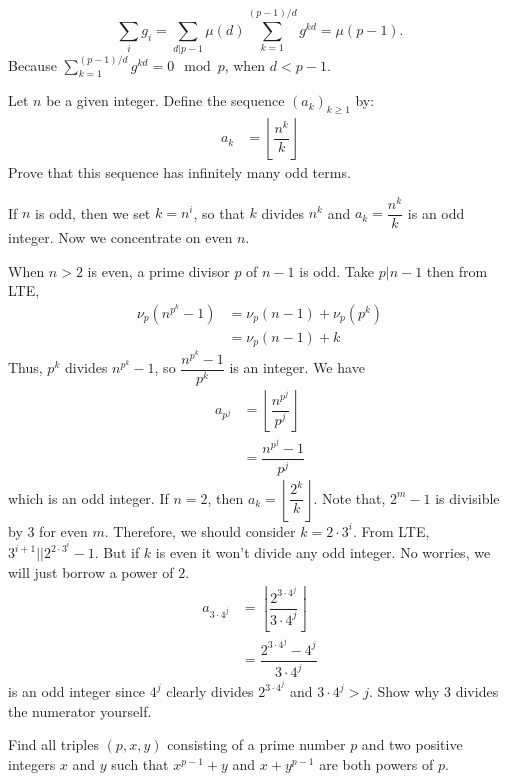 \documentclass[problems.tex]{subfile}
\begin{document}
	\begin{solution}
		\[\sum_ig_i=\sum_{d|p-1}\mu(d)\sum_{k=1}^{(p-1)/d}g^{kd}=\mu(p-1).\]
		Because $\sum_{k=1}^{(p-1)/d}g^{kd}=0\mod p$, when $d<p-1$.
	\end{solution}
	
	\begin{problem}
		Let $n$ be a given integer. Define the sequence $(a_k)_{k\geq1}$ by:
			\begin{align*}
				a_k & = \left\lfloor\dfrac{n^k}{k}\right\rfloor
			\end{align*}
		Prove that this sequence has infinitely many odd terms.
	\end{problem}
	
	\begin{solution}
		If $n$ is odd, then we set $k=n^i$, so that $k$ divides $n^k$ and $a_k=\dfrac{n^k}{k}$ is an odd integer. Now we concentrate on even $n$.
		
		When $n>2$ is even, a prime divisor $p$ of $n-1$ is odd. Take $p|n-1$ then from LTE,
			\begin{align*}
				\nu_p\left(n^{p^k}-1\right) & = \nu_p(n-1)+\nu_p(p^k)\\
											& = \nu_p(n-1)+k
			\end{align*}
		Thus, $p^k$ divides $n^{p^k}-1$, so $\dfrac{n^{p^k}-1}{p^k}$ is an integer. We have
			\begin{align*}
				a_{p^j} & = \left\lfloor\dfrac{n^{p^j}}{p^j}\right\rfloor\\
						& = \dfrac{n^{p^j}-1}{p^j}
			\end{align*}
		which is an odd integer. If $n=2$, then $a_k=\left\lfloor\dfrac{2^k}{k}\right\rfloor$. Note that, $2^m-1$ is divisible by $3$ for even $m$. Therefore, we should consider $k=2\cdot3^i$. From LTE, $3^{i+1}||2^{2\cdot3^i}-1$. But if $k$ is even it won't divide any odd integer. No worries, we will just borrow a power of $2$.
			\begin{align*}
				a_{3\cdot4^j} & = \left\lfloor\dfrac{2^{3\cdot4^j}}{3\cdot4^j}\right\rfloor\\
							  & = \dfrac{2^{3\cdot4^j}-4^j}{3\cdot4^j}
			\end{align*}
		is an odd integer since $4^j$ clearly divides $2^{3\cdot4^j}$ and $3\cdot4^j>j$. Show why $3$ divides the numerator yourself.
	\end{solution}
	
	\begin{problem}
		Find all triples $(p,x,y)$ consisting of a prime number $p$ and two positive integers $x$ and $y$ such that $x^{p-1}+y$ and $x+y^{p-1}$ are both powers of $p$.
	\end{problem}
	
\end{document}
